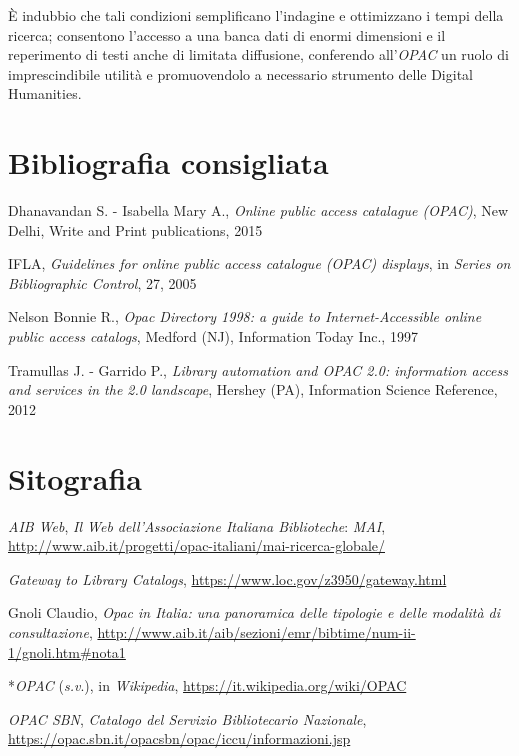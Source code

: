 \documentclass[
  b5paper,
  twoside,
  12pt,
  chapterprefix=false,
  bibliography=totocnumbered,
  parskip=false]{scrbook}
\begin{document}
È indubbio che tali condizioni semplificano l'indagine e ottimizzano i
tempi della ricerca; consentono l'accesso a una banca dati di enormi
dimensioni e il reperimento di testi anche di limitata diffusione,
conferendo all'\emph{OPAC} un ruolo di imprescindibile utilità e
promuovendolo a necessario strumento delle Digital Humanities.

\hypertarget{bibliografia-consigliata-18}{%
\section*{Bibliografia consigliata}\label{bibliografia-consigliata-18}}

Dhanavandan S. - Isabella Mary A., \emph{Online public access catalague
(OPAC)}, New Delhi, Write and Print publications, 2015

IFLA, \emph{Guidelines for online public access catalogue (OPAC) displays},
in \emph{Series on Bibliographic Control}, 27, 2005

Nelson Bonnie R., \emph{Opac Directory 1998: a guide to Internet-Accessible
online public access catalogs}, Medford (NJ), Information Today Inc.,
1997

Tramullas J. - Garrido P., \emph{Library automation and OPAC 2.0: information
access and services in the 2.0 landscape}, Hershey (PA), Information
Science Reference, 2012

\hypertarget{sitografia-24}{%
\section*{Sitografia}\label{sitografia-24}}

\emph{AIB Web}, \emph{Il Web dell'Associazione Italiana Biblioteche}: \emph{MAI},
\url{http://www.aib.it/progetti/opac-italiani/mai-ricerca-globale/}

\emph{Gateway to Library Catalogs},
\url{https://www.loc.gov/z3950/gateway.html}

Gnoli Claudio, \emph{Opac in Italia: una panoramica delle tipologie e delle
modalità di consultazione},
\url{http://www.aib.it/aib/sezioni/emr/bibtime/num-ii-1/gnoli.htm\#nota1}

*\emph{OPAC} (\emph{s.v}.), in \emph{Wikipedia},
\url{https://it.wikipedia.org/wiki/OPAC}

\emph{OPAC SBN}, \emph{Catalogo del Servizio Bibliotecario Nazionale},
\url{https://opac.sbn.it/opacsbn/opac/iccu/informazioni.jsp}
\end{document}
